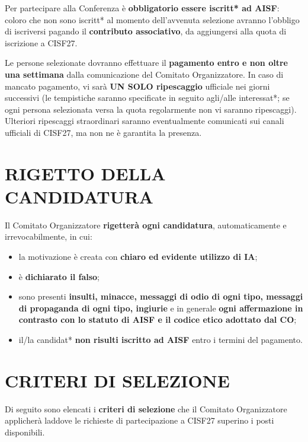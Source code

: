 \documentclass[12pt,a4paper]{article}
\begin{document}
Per partecipare alla Conferenza è \textbf{obbligatorio essere iscritt* ad AISF}: coloro che non sono iscritt* al momento dell'avvenuta selezione avranno l'obbligo di iscriversi pagando il \textbf{contributo associativo}, da aggiungersi alla quota di iscrizione a CISF27.

Le persone selezionate dovranno effettuare il \textbf{pagamento entro e non oltre una settimana} dalla comunicazione del Comitato Organizzatore. In caso di mancato pagamento, vi sarà \textbf{UN SOLO ripescaggio} ufficiale nei giorni successivi (le tempistiche saranno specificate in seguito agli/alle interessat*; se ogni persona selezionata versa la quota regolarmente non vi saranno ripescaggi). Ulteriori ripescaggi straordinari saranno eventualmente comunicati sui canali ufficiali di CISF27, ma non ne è garantita la presenza.

\section*{RIGETTO DELLA CANDIDATURA}

Il Comitato Organizzatore \textbf{rigetterà ogni candidatura}, automaticamente e irrevocabilmente, in cui:

\begin{itemize}[topsep=4pt,itemsep=4pt,parsep=0pt]
  \item la motivazione è creata con \textbf{chiaro ed evidente utilizzo di IA};
  \item è \textbf{dichiarato il falso};
  \item sono presenti \textbf{insulti, minacce, messaggi di odio di ogni tipo, messaggi di propaganda di ogni tipo, ingiurie} e in generale \textbf{ogni affermazione in contrasto con lo statuto di AISF e il codice etico adottato dal CO};
  \item il/la candidat* \textbf{non risulti iscritto ad AISF} entro i termini del pagamento.
\end{itemize}

\section*{CRITERI DI SELEZIONE}

Di seguito sono elencati i \textbf{criteri di selezione} che il Comitato Organizzatore applicherà laddove le richieste di partecipazione a CISF27 superino i posti disponibili.
\end{document}
